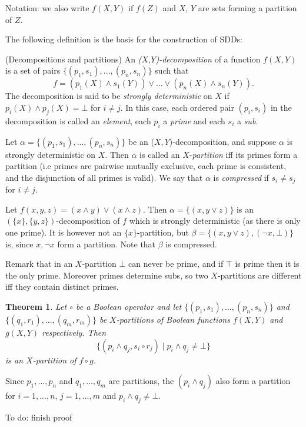 \documentclass[11pt]{article}
\newtheorem{theorem}{Theorem}[section]
\newenvironment{proof}[1][Proof]{\begin{trivlist}
\item[\hskip \labelsep {\bfseries #1}]}{\end{trivlist}}
\newenvironment{definition}[1][Definition]{\begin{trivlist}
\item[\hskip \labelsep {\bfseries #1}]}{\end{trivlist}}
\newenvironment{example}[1][Example]{\begin{trivlist}
\item[\hskip \labelsep {\bfseries #1}]}{\end{trivlist}}
\begin{document}
\noindent Notation: we also write $f(X, Y)$ if $f(Z)$ and $X$, $Y$ are sets forming a partition of $Z$.

The following definition is the basis for the construction of SDDs:

\begin{definition} (Decompositions and partitions)
An \textit{($X$,$Y$)-decomposition} of a function $f(X, Y)$ is a set of pairs $\{(p_1, s_1),...,(p_n, s_n)\}$ such that $$ f = (p_1(X) \land s_1(Y)) \lor ... \lor (p_n(X) \land s_n(Y)).$$
The decomposition is said to be \textit{strongly deterministic} on $X$ if $p_i(X) \land p_j(X) = \bot$ for $i \neq j$. In this case, each ordered pair $(p_i, s_i)$ in the decomposition is called an \textit{element}, each $p_i$ a \textit{prime} and each $s_i$ a \textit{sub}.

Let $\alpha = \{(p_1, s_1),...,(p_n, s_n)\}$ be an ($X,Y$)-decomposition, and suppose $\alpha$ is strongly deterministic on $X$.
Then $\alpha$ is called an $X$-\textit{partition} iff its primes form a partition (i.e primes are pairwise mutually exclusive, each prime is consistent, and the disjunction of all primes is valid).
We say that $\alpha$ is \textit{compressed} if $s_i \neq s_j$ for $i \neq j$.
\end{definition}

\begin{example} 
Let $f(x, y, z) = (x \land y) \lor (x \land z)$. Then $\alpha = \{(x, y\lor z)\}$ is an $(\{x\}, \{y, z\})$-decomposition of $f$ which is strongly deterministic (as there is only one prime). It is however not an $\{x\}$-partition, but $\beta = \{(x, y\lor z), (\lnot x, \bot)\}$ is, since $x, \lnot x$ form a partition. Note that $\beta$ is compressed. 
\end{example}

\noindent Remark that in an $X$-partition $\bot$ can never be prime, and if $\top$ is prime then it is the only prime. Moreover primes determine subs, so two $X$-partitions are different iff they contain distinct primes.

\begin{theorem}
\label{theorem_apply}
Let $\circ$ be a Boolean operator and let $\{(p_1, s_1),...,(p_n, s_n)\}$ and $\{(q_1, r_1),...,(q_m, r_m)\}$  be $X$-partitions of Boolean functions $f(X, Y)$ and $g(X, Y)$ respectively. Then $$\{(p_i \land q_j, s_i \circ r_j) \mid  p_i \land q_j  \neq \bot \}$$ is an $X$-partition of $f \circ g$.
\end{theorem}
\begin{proof}
 Since $p_1, ..., p_n$ and $q_1, ..., q_m$ are partitions, the $(p_i \land q_j)$ also form a partition for $i = 1, ..., n$, $j = 1, ..., m$ and $p_i \land q_j \neq \bot$. 
 
To do: finish proof 
\end{proof}
\end{document}

